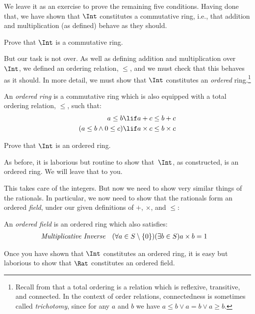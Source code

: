 \documentclass[../../../include/open-logic-section]{subfiles}
\begin{document}
We leave it as an exercise to prove the remaining five conditions.
Having done that, we have shown that $\Int$ constitutes a commutative
ring, i.e., that addition and multiplication (as defined) behave as
they should.

\begin{prob}
Prove that $\Int$ is a commutative ring.
\end{prob}

But our task is not over. As well as defining addition and
multiplication over $\Int$, we defined an ordering relation, $\leq$,
and we must check that this behaves as it should. In more detail, we
must show that $\Int$ constitutes an \emph{ordered} ring.\footnote{Recall
	from  that a total ordering
	is a relation which is reflexive, transitive, and connected. In the
	context of order relations, connectedness is sometimes called
	\emph{trichotomy}, since for any $a$ and $b$ we have $a \leq b \lor a
	= b \lor a \geq b$.} 

\begin{defn}
An \emph{ordered ring} is a commutative ring which is also equipped
with a total ordering relation, $\leq$, such that:
\begin{align*}
	a \leq b &\lif a + c \leq b + c\\
	(a \leq b \land 0 \leq c) &\lif a \times c \leq b \times c
\end{align*}
\end{defn}

\begin{prob}
Prove that $\Int$ is an ordered ring. 
\end{prob}

As before, it is laborious but routine to show that~$\Int$, as
constructed, is an ordered ring. We will leave that to you.

This takes care of the integers. But now we need to show very similar
things of the rationals. In particular, we now need to show that the
rationals form an ordered \emph{field}, under our given definitions of
$+$, $\times$, and $\leq$:
\begin{defn}
An \emph{ordered field} is an ordered ring which also satisfies:
\begin{align*}
	\emph{Multiplicative Inverse}& & (\forall a \in S \setminus \{0\})(\exists b \in S) a\times b& = 1
\end{align*}
\end{defn}

Once you have shown that $\Int$ constitutes an ordered ring, it is
easy but laborious to show that $\Rat$ constitutes an ordered field.
\end{document}
